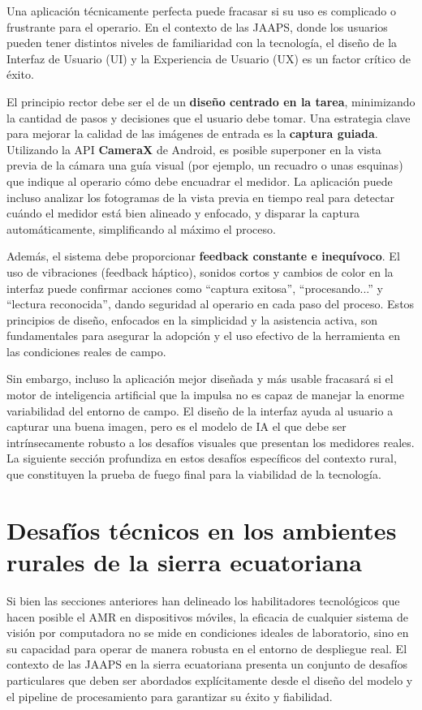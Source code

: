 Una aplicación técnicamente perfecta puede fracasar si su uso es complicado o frustrante para el operario. En el contexto de las JAAPS, donde los usuarios pueden tener distintos niveles de familiaridad con la tecnología, el diseño de la Interfaz de Usuario (UI) y la Experiencia de Usuario (UX) es un factor crítico de éxito.

El principio rector debe ser el de un \textbf{diseño centrado en la tarea}, minimizando la cantidad de pasos y decisiones que el usuario debe tomar. Una estrategia clave para mejorar la calidad de las imágenes de entrada es la \textbf{captura guiada}. Utilizando la API \textbf{CameraX} de Android, es posible superponer en la vista previa de la cámara una guía visual (por ejemplo, un recuadro o unas esquinas) que indique al operario cómo debe encuadrar el medidor. La aplicación puede incluso analizar los fotogramas de la vista previa en tiempo real para detectar cuándo el medidor está bien alineado y enfocado, y disparar la captura automáticamente, simplificando al máximo el proceso.

Además, el sistema debe proporcionar \textbf{feedback constante e inequívoco}. El uso de vibraciones (feedback háptico), sonidos cortos y cambios de color en la interfaz puede confirmar acciones como ``captura exitosa'', ``procesando...'' y ``lectura reconocida'', dando seguridad al operario en cada paso del proceso. Estos principios de diseño, enfocados en la simplicidad y la asistencia activa, son fundamentales para asegurar la adopción y el uso efectivo de la herramienta en las condiciones reales de campo.

Sin embargo, incluso la aplicación mejor diseñada y más usable fracasará si el motor de inteligencia artificial que la impulsa no es capaz de manejar la enorme variabilidad del entorno de campo. El diseño de la interfaz ayuda al usuario a capturar una buena imagen, pero es el modelo de IA el que debe ser intrínsecamente robusto a los desafíos visuales que presentan los medidores reales. La siguiente sección profundiza en estos desafíos específicos del contexto rural, que constituyen la prueba de fuego final para la viabilidad de la tecnología.

\section{Desafíos técnicos en los ambientes rurales de la sierra ecuatoriana}
\label{sec:rural_technical_challenges}

Si bien las secciones anteriores han delineado los habilitadores tecnológicos que hacen posible el AMR en dispositivos móviles, la eficacia de cualquier sistema de visión por computadora no se mide en condiciones ideales de laboratorio, sino en su capacidad para operar de manera robusta en el entorno de despliegue real. El contexto de las JAAPS en la sierra ecuatoriana presenta un conjunto de desafíos particulares que deben ser abordados explícitamente desde el diseño del modelo y el pipeline de procesamiento para garantizar su éxito y fiabilidad.

